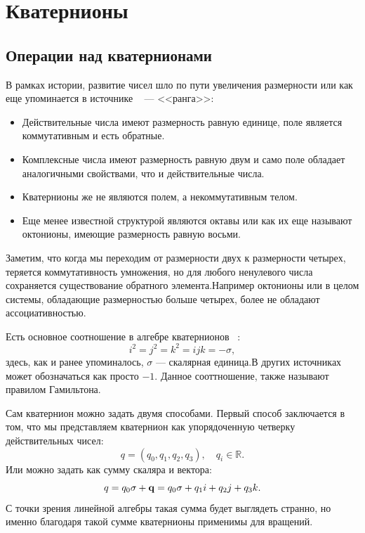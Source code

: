 \chapter{Кватернионы}
\section{Операции над кватернионами}

В рамках истории, развитие чисел шло по пути увеличения размерности или как еще упоминается в источнике ~\cite{Kuipers:1999} --- <<ранга>>:
\begin{itemize}
    \item Действительные числа имеют размерность равную единице, поле является коммутативным и есть обратные.
    \item Комплексные числа имеют размерность равную двум и само поле обладает аналогичными свойствами, что и действительные числа.
    \item Кватернионы же не являются полем, а некоммутативным телом.
    \item Еще менее известной структурой являются октавы или как их еще называют октонионы, имеющие размерность равную восьми.
\end{itemize}
Заметим, что когда мы переходим от размерности двух к размерности четырех, теряется коммутативность умножения, но для любого ненулевого числа сохраняется существование обратного элемента.Например октонионы или в целом системы, обладающие размерностью больше четырех, более не обладают ассоциативностью.

Есть основное соотношение в алгебре кватернионов ~\cite{Goldman:2010}:
\begin{equation*}
    i^2 = j^2 = k^2 = i j k = -\sigma,
\end{equation*}
здесь, как и ранее упоминалось, $\sigma$ --- скалярная единица.В других источниках может обозначаться как просто $-1$. Данное сооттношение, также называют правилом Гамильтона.

Сам кватернион можно задать двумя способами. Первый способ заключается в том, что мы представляем кватернион как упорядоченную четверку действительных чисел:
\begin{equation*}
    q = (q_0, q_1, q_2, q_3), \quad q_i \in \mathbb{R}.
\end{equation*}
Или можно задать как сумму скаляра и вектора:
\begin{equation*}
    q = q_0 \sigma + \vb{q} = q_0 \sigma + q_1 i + q_2 j + q_3 k.
\end{equation*}
С точки зрения линейной алгебры такая сумма будет выглядеть странно, но именно благодаря такой сумме кватернионы применимы для вращений. 

